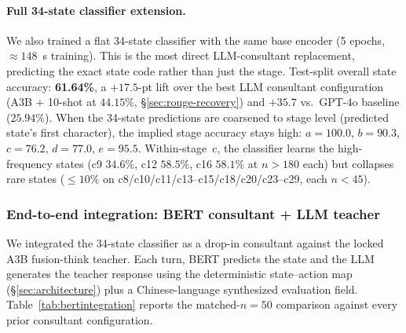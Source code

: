 \documentclass[11pt]{article}
\begin{document}
\paragraph{Full 34-state classifier extension.} We also trained a flat 34-state classifier with the same base encoder (5 epochs, $\approx 148$~s training). This is the most direct LLM-consultant replacement, predicting the exact state code rather than just the stage. Test-split overall state accuracy: \textbf{61.64\%}, a $+17.5$-pt lift over the best LLM consultant configuration (A3B + 10-shot at $44.15\%$, \S\ref{sec:rouge-recovery}) and $+35.7$ vs.\ GPT-4o baseline ($25.94\%$). When the 34-state predictions are coarsened to stage level (predicted state's first character), the implied stage accuracy stays high: $a{=}100.0$, $b{=}90.3$, $c{=}76.2$, $d{=}77.0$, $e{=}95.5$. Within-stage~c, the classifier learns the high-frequency states (c9 $34.6\%$, c12 $58.5\%$, c16 $58.1\%$ at $n{>}180$ each) but collapses rare states ($\leq 10\%$ on c8/c10/c11/c13--c15/c18/c20/c23--c29, each $n{<}45$).

\subsubsection{End-to-end integration: BERT consultant + LLM teacher}
\label{sec:bert-integration}

We integrated the 34-state classifier as a drop-in consultant against the locked A3B fusion-think teacher. Each turn, BERT predicts the state and the LLM generates the teacher response using the deterministic state--action map (\S\ref{sec:architecture}) plus a Chinese-language synthesized evaluation field. Table~\ref{tab:bertintegration} reports the matched-$n{=}50$ comparison against every prior consultant configuration.
\end{document}
